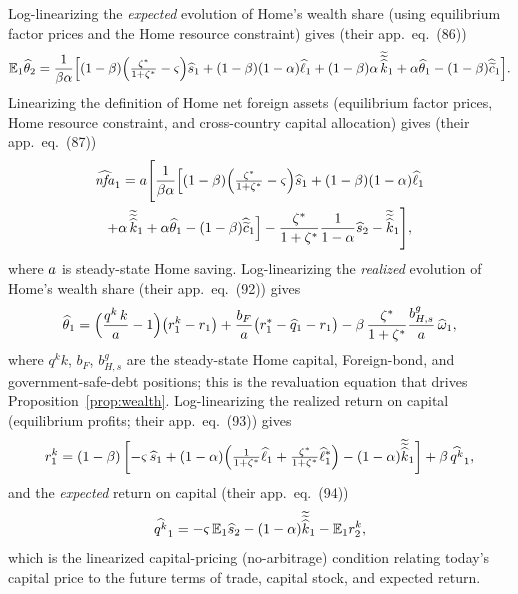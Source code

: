 Log-linearizing the \emph{expected} evolution of Home's wealth share (using
equilibrium factor prices and the Home resource constraint) gives (their
app.~eq.~(86))
\begin{equation}
\mathbb{E}_1\widehat{\theta}_2 = \frac{1}{\beta\alpha}\Bigl[(1-\beta)\Bigl(\tfrac{\zeta^{*}}{1+\zeta^{*}}-\varsigma\Bigr)\widehat{s}_1
+(1-\beta)(1-\alpha)\widehat{\ell}_1
+(1-\beta)\alpha\,\widetilde{\widetilde{\widehat{k}}}_1+\alpha\widehat{\theta}_1
-(1-\beta)\widehat{\widetilde{c}}_1\Bigr]. \label{eq:Ewsh-raw}
\end{equation}
Linearizing the definition of Home net foreign assets (equilibrium factor
prices, Home resource constraint, and cross-country capital allocation) gives
(their app.~eq.~(87))
\begin{multline}
\widehat{\mathit{nfa}}_1 = a\Biggl[\frac{1}{\beta\alpha}\Bigl[(1-\beta)\Bigl(\tfrac{\zeta^{*}}{1+\zeta^{*}}-\varsigma\Bigr)\widehat{s}_1
+(1-\beta)(1-\alpha)\widehat{\ell}_1\\
+\alpha\,\widetilde{\widetilde{\widehat{k}}}_1+\alpha\widehat{\theta}_1-(1-\beta)\widehat{\widetilde{c}}_1\Bigr]
-\frac{\zeta^{*}}{1+\zeta^{*}}\frac{1}{1-\alpha}\widehat{s}_2-\widetilde{\widetilde{\widehat{k}}}_1\Biggr], \label{eq:nfa-raw}
\end{multline}
where $a$ is steady-state Home saving. Log-linearizing the \emph{realized}
evolution of Home's wealth share (their app.~eq.~(92)) gives
\begin{equation}
\widehat{\theta}_1 = \Bigl(\frac{q^{k}\,k}{a}-1\Bigr)\bigl(r^{k}_1-r_1\bigr)
+\frac{b_F}{a}\bigl(r^{*}_1-\widehat{q}_1-r_1\bigr)
-\beta\,\frac{\zeta^{*}}{1+\zeta^{*}}\frac{b^g_{H,s}}{a}\,\widehat{\omega}_1, \label{eq:wsh-realized}
\end{equation}
where $q^kk$, $b_F$, $b^g_{H,s}$ are the steady-state Home capital, Foreign-bond,
and government-safe-debt positions; this is the revaluation equation that drives
Proposition~\ref{prop:wealth}. Log-linearizing the realized return on capital
(equilibrium profits; their app.~eq.~(93)) gives
\begin{equation}
r^{k}_1 = (1-\beta)\left[-\varsigma\,\widehat{s}_1 + (1-\alpha)\Bigl(\tfrac{1}{1+\zeta^{*}}\widehat{\ell}_1+\tfrac{\zeta^{*}}{1+\zeta^{*}}\widehat{\ell}^{*}_1\Bigr)
-(1-\alpha)\widetilde{\widetilde{\widehat{k}}}_1\right]+\beta\,\widehat{q^{k}}_1, \label{eq:rk1-raw}
\end{equation}
and the \emph{expected} return on capital (their app.~eq.~(94))
\begin{equation}
\widehat{q^{k}}_1 = -\varsigma\,\mathbb{E}_1\widehat{s}_2 - (1-\alpha)\widetilde{\widetilde{\widehat{k}}}_1 - \mathbb{E}_1r^{k}_2, \label{eq:qk1-raw}
\end{equation}
which is the linearized capital-pricing (no-arbitrage) condition relating today's
capital price to the future terms of trade, capital stock, and expected return.

